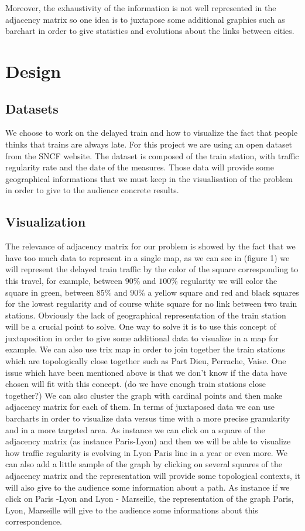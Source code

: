 \documentclass{vgtc}                          %
\begin{document}
Moreover, the exhaustivity of the information is not well represented in the adjacency matrix so one idea is to juxtapose some additional graphics such as barchart in order to give statistics and evolutions about the links between cities.

\section{Design}
\subsection{Datasets}
We choose to work on the delayed train and how to visualize the fact that people thinks that trains are always late. For this project we are using an open dataset from the SNCF website. The dataset is composed of the train station, with traffic regularity rate and the date of the measures. Those data will provide some geographical informations that we must keep in the visualisation of the problem in order to give to the audience concrete results.



\subsection{Visualization}
The relevance of adjacency matrix for our problem is showed by the fact that we have too much data to represent in a single map, as we can see in (figure 1) we will represent the delayed train traffic by the color of the square corresponding to this travel, for example, between $90\%$ and $100\%$ regularity we will color the square in green, between $85\%$ and $90\%$ a yellow square and red and black squares for the lowest regularity and of course white square for no link between two train stations. Obviously the lack of geographical representation of the train station will be a crucial point to solve. One way to solve it is to use this concept of juxtaposition in order to give some additional data to visualize in a map for example. We can also use trix map in order to join together the train stations which are topologically close together such as Part Dieu, Perrache, Vaise. One issue which have been mentioned above is that we don’t know if the data have chosen will fit with this concept. (do we have enough train stations close together?) We can also cluster the graph with cardinal points and then make adjacency matrix for each of them. 
In terms of juxtaposed data we can use barcharts in order to visualize data versus time with a more precise granularity and in a more targeted area. As instance we can click on a square of the adjacency matrix (as instance Paris-Lyon) and then we will be able to visualize how traffic regularity is evolving in Lyon Paris line in a year or even more.
We can also add a little sample of the graph by clicking on several squares of the adjacency matrix and the representation will provide some topological contexts, it will also give to the audience some information about a path. As instance if we click on Paris -Lyon and Lyon - Marseille, the representation of the graph Paris, Lyon, Marseille will give to the audience some informations about this correspondence.
\end{document}
